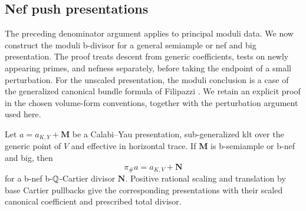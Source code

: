\subsection{Nef push presentations}

The preceding denominator argument applies to principal moduli data.
We now construct the moduli b-divisor for a general semiample or nef and
big presentation. The proof treats descent from generic coefficients,
tests on newly appearing primes, and nefness separately, before taking
the endpoint of a small perturbation. For the unscaled presentation, the
moduli conclusion is a case of the generalized canonical bundle formula
of Filipazzi \cite[Theorem~1.4]{FilipazziGeneralized}. We retain an
explicit proof in the chosen volume-form conventions, together with the
perturbation argument used here.

\begin{proposition}\label{b:push-presentation}
Let \(a=a_{K,Y}+\mathbf M\) be a Calabi--Yau presentation, sub-generalized
klt over the generic point of \(V\) and effective in horizontal trace.
If \(\mathbf M\) is b-semiample or b-nef and big, then
\[
                        \pi_\#a=a_{K,V}+\mathbf N
\]
for a b-nef b-\(\mathbb Q\)-Cartier divisor \(\mathbf N\).
Positive rational scaling and translation by base Cartier pullbacks
give the corresponding presentations with their scaled canonical
coefficient and prescribed total divisor.
\end{proposition}

